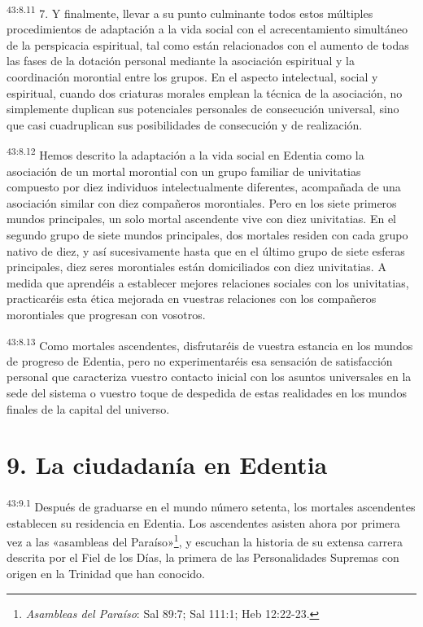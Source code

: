 \par
\textsuperscript{43:8.11} 7. Y finalmente, llevar a su punto culminante todos estos múltiples procedimientos de adaptación a la vida social con el acrecentamiento simultáneo de la perspicacia espiritual, tal como están relacionados con el aumento de todas las fases de la dotación personal mediante la asociación espiritual y la coordinación morontial entre los grupos. En el aspecto intelectual, social y espiritual, cuando dos criaturas morales emplean la técnica de la asociación, no simplemente duplican sus potenciales personales de consecución universal, sino que casi cuadruplican sus posibilidades de consecución y de realización.

\par
\textsuperscript{43:8.12} Hemos descrito la adaptación a la vida social en Edentia como la asociación de un mortal morontial con un grupo familiar de univitatias compuesto por diez individuos intelectualmente diferentes, acompañada de una asociación similar con diez compañeros morontiales. Pero en los siete primeros mundos principales, un solo mortal ascendente vive con diez univitatias. En el segundo grupo de siete mundos principales, dos mortales residen con cada grupo nativo de diez, y así sucesivamente hasta que en el último grupo de siete esferas principales, diez seres morontiales están domiciliados con diez univitatias. A medida que aprendéis a establecer mejores relaciones sociales con los univitatias, practicaréis esta ética mejorada en vuestras relaciones con los compañeros morontiales que progresan con vosotros.

\par
\textsuperscript{43:8.13} Como mortales ascendentes, disfrutaréis de vuestra estancia en los mundos de progreso de Edentia, pero no experimentaréis esa sensación de satisfacción personal que caracteriza vuestro contacto inicial con los asuntos universales en la sede del sistema o vuestro toque de despedida de estas realidades en los mundos finales de la capital del universo.

\section*{9. La ciudadanía en Edentia}
\par
\textsuperscript{43:9.1} Después de graduarse en el mundo número setenta, los mortales ascendentes establecen su residencia en Edentia. Los ascendentes asisten ahora por primera vez a las «asambleas del Paraíso»\footnote{\textit{Asambleas del Paraíso}: Sal 89:7; Sal 111:1; Heb 12:22-23.}, y escuchan la historia de su extensa carrera descrita por el Fiel de los Días, la primera de las Personalidades Supremas con origen en la Trinidad que han conocido.

